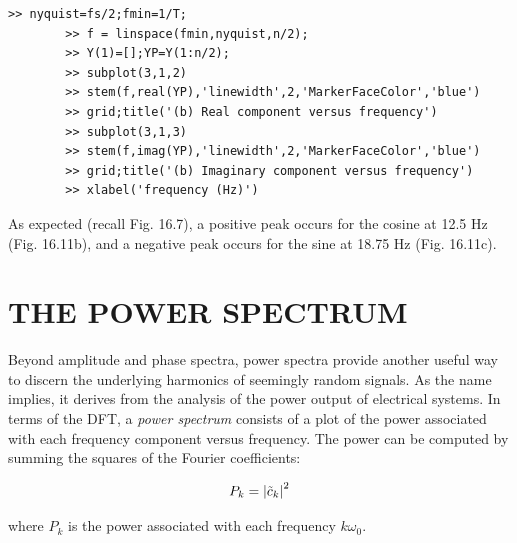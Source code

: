 \documentclass[../main.tex]{subfiles}
\begin{document}
\begin{example}
	\begin{lstlisting}[numbers=none]
		>> nyquist=fs/2;fmin=1/T;
		>> f = linspace(fmin,nyquist,n/2);
		>> Y(1)=[];YP=Y(1:n/2);
		>> subplot(3,1,2)
		>> stem(f,real(YP),'linewidth',2,'MarkerFaceColor','blue')
		>> grid;title('(b) Real component versus frequency')
		>> subplot(3,1,3)
		>> stem(f,imag(YP),'linewidth',2,'MarkerFaceColor','blue')
		>> grid;title('(b) Imaginary component versus frequency')
		>> xlabel('frequency (Hz)')
	\end{lstlisting}

	\noindent As expected (recall Fig. 16.7), a positive peak occurs for the cosine at 12.5 Hz
	(Fig. 16.11b), and a negative peak occurs for the sine at 18.75 Hz (Fig. 16.11c).
\end{example}

\label{cha:cha_P_16_6}
\section{THE POWER SPECTRUM}

\noindent Beyond amplitude and phase spectra, power spectra provide another useful way to discern
the underlying harmonics of seemingly random signals. As the name implies, it derives
from the analysis of the power output of electrical systems. In terms of the DFT, a \textit{power
spectrum} consists of a plot of the power associated with each frequency component versus
frequency. The power can be computed by summing the squares of the Fourier coefficients:

\begin{equation}
	\notag
	P_k = {|\tilde{c}_k|}^2
\end{equation}

\noindent where $P_k$ is the power associated with each frequency $k \omega_0$.
\end{document}
